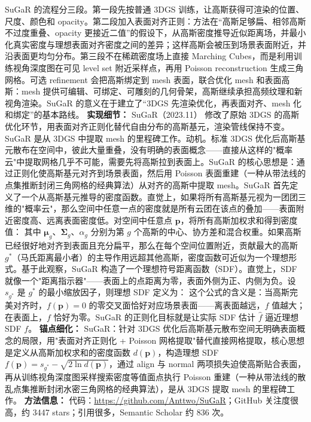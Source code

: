 SuGaR 的流程分三段。第一段先按普通 3DGS 训练，让高斯获得可渲染的位置、尺度、颜色和 opacity。第二段加入表面对齐正则：方法在“高斯足够扁、相邻高斯不过度重叠、opacity 更接近二值”的假设下，从高斯密度推导近似距离场，并最小化真实密度与理想表面对齐密度之间的差异；这样高斯会被压到场景表面附近，并沿表面更均匀分布。第三段不在稀疏密度场上直接 Marching Cubes，而是利用训练视角深度图在可见 level set 附近采样点，再用 Poisson reconstruction 生成三角网格。可选 refinement 会把高斯绑定到 mesh 表面，联合优化 mesh 和表面高斯：mesh 提供可编辑、可绑定、可雕刻的几何骨架，高斯继续承担高频纹理和新视角渲染。SuGaR 的意义在于建立了“3DGS 先渲染优化，再表面对齐、mesh 化和绑定”的基本路线。
\textbf{实现细节：} SuGaR（2023.11） 修改了原始 3DGS 的高斯优化环节，用表面对齐正则化替代自由分布的高斯基元，渲染管线保持不变。SuGaR 是从 3DGS 中提取 mesh 的里程碑工作。动机。标准 3DGS 优化后高斯基元散布在空间中，彼此大量重叠，没有明确的表面概念——直接从这样的"概率云"中提取网格几乎不可能，需要先将高斯拉到表面上。SuGaR 的核心思想是：通过正则化使高斯基元对齐到场景表面，然后用 Poisson 表面重建（一种从带法线的点集推断封闭三角网格的经典算法）从对齐的高斯中提取 mesh。SuGaR 首先定义了一个从高斯基元推导的密度函数。直觉上，如果将所有高斯基元视为一团团三维的"概率云"，那么空间中任意一点的密度就是所有云团在该点的叠加——表面附近密度高、远离表面密度低。对空间中任意点 $\mathbf{p}$，将所有高斯加权求和得到密度值： 其中 $\boldsymbol{\mu}_g$、$\boldsymbol{\Sigma}_g$、$\alpha_g$ 分别为第 $g$ 个高斯的中心、协方差和混合权重。如果高斯已经很好地对齐到表面且充分扁平，那么在每个空间位置附近，贡献最大的高斯 $g^{*}$（马氏距离最小者）的主导作用远超其他高斯，密度函数可近似为一个理想形式。基于此观察，SuGaR 构造了一个理想符号距离函数（SDF）。直觉上，SDF 就像一个"距离指示器"——表面上的点距离为零，表面外侧为正、内侧为负。设 $s_{g^{*}}$ 是 $g^{*}$ 的最小缩放因子，则理想 SDF 定义为： 这个公式的含义是：当高斯完美对齐时，$f(\mathbf{p})=0$ 的零交叉面恰好对应场景表面——离表面越远，$f$ 值越大；在表面上，$f$ 恰好为零。SuGaR 的正则化目标就是让实际 SDF 估计 $\hat{f}$ 逼近理想 SDF $f$。
\textbf{锚点细化：} SuGaR：针对 3DGS 优化后高斯基元散布空间无明确表面概念的局限，用"表面对齐正则化 + Poisson 网格提取"替代直接网格提取，核心思想是定义从高斯加权求和的密度函数 $d(\mathbf{p})$，构造理想 SDF $f(\mathbf{p}) = s_{g^{*}} - \sqrt{2\ln d(\mathbf{p})}$，通过 align 与 normal 两项损失迫使高斯贴合表面，再从训练视角深度图采样搜索密度等值面点执行 Poisson 重建（一种从带法线的散乱点集推断封闭水密三角网格的经典算法），是从 3DGS 提取 mesh 的里程碑工作。
\textbf{方法信息：} 代码：\url{https://github.com/Anttwo/SuGaR}；GitHub 关注度很高，约 3447 stars；引用很多，Semantic Scholar 约 836 次。



